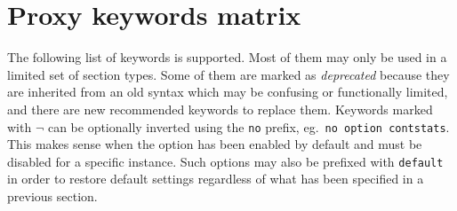 
\section{Proxy keywords matrix}

\newcommand{\NO}{$\circ$}
\newcommand{\YES}{$\bullet$}
\newcommand{\optnopr}{ $\neg$}
\newcommand{\deprecated}[1]{\textsl{{\color{gray}#1}}}
\newcommand{\depword}[1]{\texttt{\deprecated{#1}}}

The following list of keywords is supported. Most of them may only be used in a
limited set of section types. Some of them are marked as \deprecated{deprecated} because
they are inherited from an old syntax which may be confusing or functionally
limited, and there are new recommended keywords to replace them. Keywords
marked with\optnopr{} can be optionally inverted using the \texttt{no} prefix,
eg.~\texttt{no option contstats}. This makes sense when the option has been enabled by default
and must be disabled for a specific instance. Such options may also be prefixed
with \texttt{default} in order to restore default settings regardless of what has been
specified in a previous  section.


